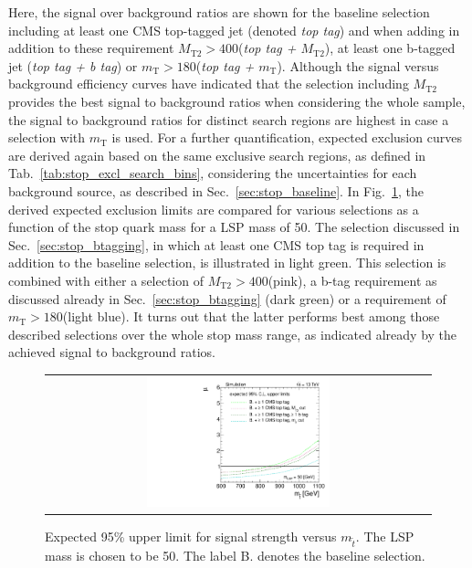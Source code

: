 Here, the signal over background ratios are shown for the baseline selection including at least one CMS top-tagged jet (denoted \textit{top tag}) and when adding in addition to these requirement $M_\mathrm{T2} > 400$\gev (\textit{top tag + $M_\mathrm{T2}$}), at least one b-tagged jet (\textit{top tag + b tag}) or $m_\mathrm{T} > 180$\gev (\textit{top tag + $m_\mathrm{T}$}). Although the signal versus background efficiency curves have indicated that the selection including $M_\mathrm{T2}$ provides the best signal to background ratios when considering the whole sample, the signal to background ratios for distinct search regions are highest in case a selection with $m_\mathrm{T}$ is used. For a further quantification, expected exclusion curves are derived again based on the same exclusive search regions, as defined in Tab.~\ref{tab:stop_excl_search_bins}, considering the uncertainties for each background source, as described in Sec.~\ref{sec:stop_baseline}. In Fig.~\ref{fig:stop_baselinetoptag_limit}, the derived expected exclusion limits are compared for various selections as a function of the stop quark mass for a LSP mass of 50\gev. The selection discussed in Sec.~\ref{sec:stop_btagging}, in which at least one CMS top tag is required in addition to the baseline selection, is illustrated in light green. This selection is combined with either a selection of $M_\mathrm{T2} > 400$\gev (pink), a b-tag requirement as discussed already in Sec.~\ref{sec:stop_btagging} (dark green) or a requirement of $m_\mathrm{T} > 180$\gev (light blue). It turns out that the latter performs best among those described selections over the whole stop mass range, as indicated already by the achieved signal to background ratios. 
\begin{figure}[!h]
  \centering
  \begin{tabular}{c}
                \includegraphics[width=0.49\textwidth]{figures/limitplot4BinSel_BaselineBTagTopTagTransverseMassMT2_LSP50.pdf} 
  \end{tabular}
  \caption{Expected 95\% upper limit for signal strength versus $m_{\tilde{t}}$. The LSP mass is chosen to be 50\gev. The label B. denotes the baseline selection.}
  \label{fig:stop_baselinetoptag_limit}
\end{figure}

